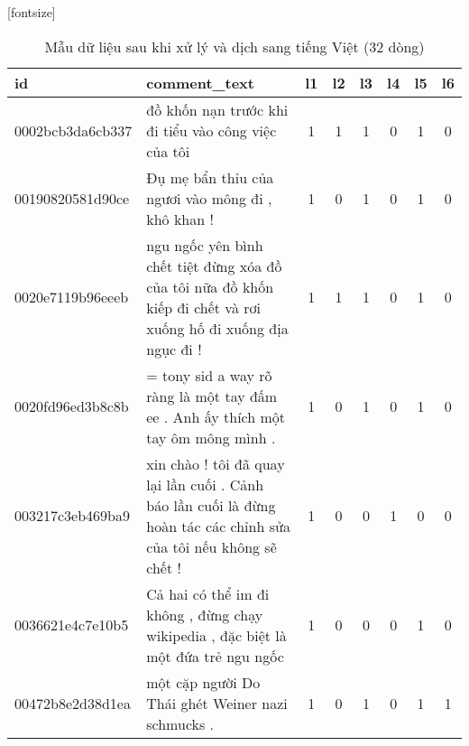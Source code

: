 \begin{sidewaystable}[htb!]
    \centering
    \caption{Mẫu dữ liệu sau khi xử lý và dịch sang tiếng Việt (32 dòng)}
    \label{table:dataset-vietnamese}
    [fontsize]
    \fontsize{8pt}{12pt}\selectfont
    \begin{tabularx}{\textwidth}{L{0.8} L{6.6} C{0.1} C{0.1} C{0.1} C{0.1} C{0.1} C{0.1}}
        \toprule
        \textbf{id}      & \textbf{comment\_text}                                                                                                            & \textbf{l1} & \textbf{l2} & \textbf{l3} & \textbf{l4} & \textbf{l5} & \textbf{l6} \\\midrule
        0002bcb3da6cb337 & đồ khốn nạn trước khi đi tiểu vào công việc của tôi                                                                               & 1           & 1           & 1           & 0           & 1           & 0           \\
        00190820581d90ce & Đụ mẹ bẩn thỉu của ngươi vào mông đi , khô khan !                                                                                 & 1           & 0           & 1           & 0           & 1           & 0           \\
        0020e7119b96eeeb & ngu ngốc yên bình chết tiệt đừng xóa đồ của tôi nữa đồ khốn kiếp đi chết và rơi xuống hố đi xuống địa ngục đi !                   & 1           & 1           & 1           & 0           & 1           & 0           \\
        0020fd96ed3b8c8b & = tony sid a way rõ ràng là một tay đấm ee . Anh ấy thích một tay ôm mông mình .                                                  & 1           & 0           & 1           & 0           & 1           & 0           \\
        003217c3eb469ba9 & xin chào ! tôi đã quay lại lần cuối . Cảnh báo lần cuối là đừng hoàn tác các chỉnh sửa của tôi nếu không sẽ chết !                & 1           & 0           & 0           & 1           & 0           & 0           \\
        0036621e4c7e10b5 & Cả hai có thể im đi không , đừng chạy wikipedia , đặc biệt là một đứa trẻ ngu ngốc                                                & 1           & 0           & 0           & 0           & 1           & 0           \\
        00472b8e2d38d1ea & một cặp người Do Thái ghét Weiner nazi schmucks .                                                                                 & 1           & 0           & 1           & 0           & 1           & 1           \\

\end{tabularx}
\end{sidewaystable}
